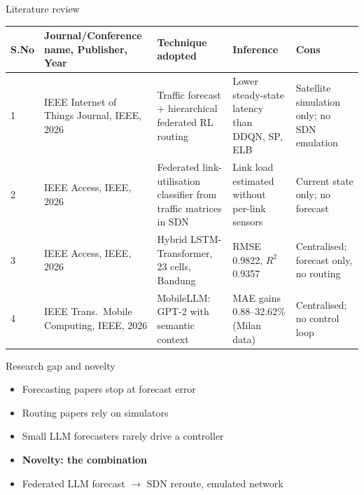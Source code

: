 \documentclass[11pt,aspectratio=169]{beamer}
\begin{document}
\begin{frame}{Literature review}
  \footnotesize
  \setlength\tabcolsep{3pt}\renewcommand{\arraystretch}{1.15}
  \begin{tabular}{@{}>{\raggedright}p{0.5cm}>{\raggedright}p{2.8cm}>{\raggedright}p{3.4cm}>{\raggedright}p{3.4cm}>{\raggedright\arraybackslash}p{2.8cm}@{}}
    \toprule
    \textbf{S.No} & \textbf{Journal/Conference name, Publisher, Year} & \textbf{Technique adopted} & \textbf{Inference} & \textbf{Cons}\tabularnewline \midrule
    1 & IEEE Internet of Things Journal, IEEE, 2026 \cite{yang2026hfrl} & Traffic forecast + hierarchical federated RL routing & Lower steady-state latency than DDQN, SP, ELB & Satellite simulation only; no SDN emulation\tabularnewline
    2 & IEEE Access, IEEE, 2026 \cite{silva2026netlink} & Federated link-utilisation classifier from traffic matrices in SDN & Link load estimated without per-link sensors & Current state only; no forecast\tabularnewline
    3 & IEEE Access, IEEE, 2026 \cite{yuliana2026hybrid} & Hybrid LSTM-Transformer, 23 cells, Bandung & RMSE 0.9822, $R^2$ 0.9357 & Centralised; forecast only, no routing\tabularnewline
    4 & IEEE Trans.\ Mobile Computing, IEEE, 2026 \cite{wang2026mobilellm} & MobileLLM: GPT-2 with semantic context & MAE gains 0.88--32.62\% (Milan data) & Centralised; no control loop\tabularnewline
    \bottomrule
  \end{tabular}
\end{frame}

\begin{frame}{Research gap and novelty}
  \begin{itemize}
    \item Forecasting papers stop at forecast error
    \item Routing papers rely on simulators
    \item Small LLM forecasters rarely drive a controller
    \item \textbf{Novelty: the combination}
    \item Federated LLM forecast $\rightarrow$ SDN reroute, emulated network
  \end{itemize}
\end{frame}
\end{document}
